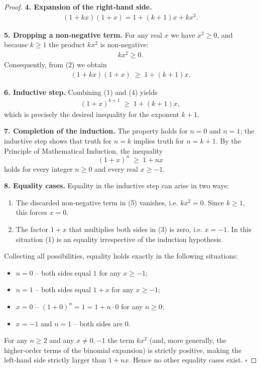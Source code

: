 \begin{proof}
\medskip\noindent\textbf{4. Expansion of the right‑hand side.}
\begin{align}
(1+kx)(1+x)=1+(k+1)x+kx^{2}. \tag{2}
\end{align}

\medskip\noindent\textbf{5. Dropping a non‑negative term.}
For any real \(x\) we have \(x^{2}\ge 0\), and because \(k\ge 1\) the product
\(k x^{2}\) is non‑negative:
\begin{align}
kx^{2}\ge 0. \tag{3}
\end{align}
Consequently, from (2) we obtain
\begin{align}
(1+kx)(1+x)\;\ge\;1+(k+1)x . \tag{4}
\end{align}

\medskip\noindent\textbf{6. Inductive step.}
Combining (1) and (4) yields
\begin{align}
(1+x)^{k+1}\;\ge\;1+(k+1)x ,
\end{align}
which is precisely the desired inequality for the exponent \(k+1\).

\medskip\noindent\textbf{7. Completion of the induction.}
The property holds for \(n=0\) and \(n=1\); the inductive step shows that
truth for \(n=k\) implies truth for \(n=k+1\).  By the Principle of
Mathematical Induction, the inequality
\[
(1+x)^{n}\;\ge\;1+nx
\]
holds for every integer \(n\ge 0\) and every real \(x\ge -1\).

\medskip\noindent\textbf{8. Equality cases.}
Equality in the inductive step can arise in two ways:
\begin{enumerate}
\item The discarded non‑negative term in (5) vanishes, i.e. \(k x^{2}=0\).
Since \(k\ge 1\), this forces \(x=0\).
\item The factor \(1+x\) that multiplies both sides in (3) is zero, i.e.
\(x=-1\).  In this situation (1) is an equality irrespective of the
induction hypothesis.
\end{enumerate}
Collecting all possibilities, equality holds exactly in the following
situations:
\begin{itemize}
\item \(n=0\) – both sides equal \(1\) for any \(x\ge -1\);
\item \(n=1\) – both sides equal \(1+x\) for any \(x\ge -1\);
\item \(x=0\) – \((1+0)^{n}=1=1+n\cdot0\) for any \(n\ge 0\);
\item \(x=-1\) and \(n=1\) – both sides are \(0\).
\end{itemize}
For any \(n\ge 2\) and any \(x\neq 0,-1\) the term \(k x^{2}\) (and, more
generally, the higher‑order terms of the binomial expansion) is strictly
positive, making the left‑hand side strictly larger than \(1+nx\).  Hence no
other equality cases exist. \(\square\)
\end{proof}